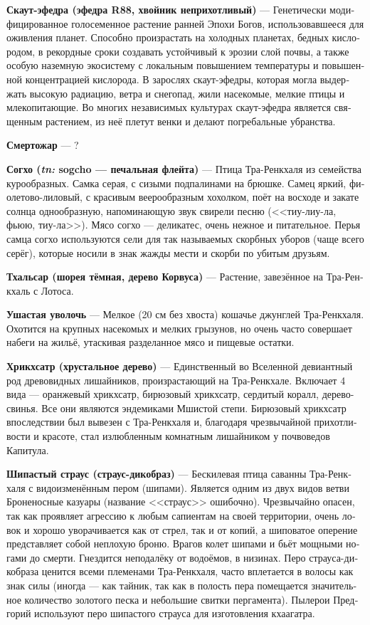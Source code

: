 \documentclass[a4paper,12pt,fleqn]{book}\usepackage{polyglossia}\setdefaultlanguage[babelshorthands=true]{russian}\setotherlanguage{english}\defaultfontfeatures{Ligatures=TeX,Mapping=tex-text}\usepackage{xcolor}\newcommand{\ml}[3]{#2}
\newcommand{\theterm}[3]{\textbf{\hypertarget{#1}{#2}} --- #3}
\newcommand{\theorigin}[3]{\textit{#1:} #2 --- #3}
\begin{document}
\theterm{scout-ephedra}
{Скаут-эфедра (эфедра R88, хвойник неприхотливый)}
{Генетически модифицированное голосеменное растение ранней Эпохи Богов, использовавшееся для оживления планет.
Способно произрастать на холодных планетах, бедных кислородом, в рекордные сроки создавать устойчивый к эрозии слой почвы, а также особую наземную экосистему с локальным повышением температуры и повышенной концентрацией кислорода.
В зарослях скаут-эфедры, которая могла выдержать высокую радиацию, ветра и снегопад, жили насекомые, мелкие птицы и млекопитающие.
Во многих независимых культурах скаут-эфедра является священным растением, из неё плетут венки и делают погребальные убранства.}

\theterm{deathly-heat}
{Смертожар}
{?}

\theterm{}
{Согхо (\theorigin{tn}{sogcho}{печальная флейта})}
{Птица Тра-Ренкхаля из семейства курообразных.
Самка серая, с сизыми подпалинами на брюшке.
Самец яркий, фиолетово-лиловый, с красивым веерообразным хохолком, поёт на восходе и закате солнца однообразную, напоминающую звук свирели песню (<<тиу-лиу-ла, фьюю, тиу-ла>>).
Мясо согхо --- деликатес, очень нежное и питательное.
Перья самца согхо используются сели для так называемых скорбных уборов (чаще всего серёг), которые носили в знак жажды мести и скорби по убитым друзьям.}

\theterm{tchal-sar}
{Тхальсар (шорея тёмная, дерево Корвуса)}
{Растение, завезённое на Тра-Ренкхаль с Лотоса.}

\theterm{large-eared-dragaway}
{Ушастая уволочь}
{Мелкое (20 см без хвоста) кошачье джунглей Тра-Ренкхаля.
Охотится на крупных насекомых и мелких грызунов, но очень часто совершает набеги на жильё, утаскивая разделанное мясо и пищевые остатки.}

\theterm{chrikchsatr}
{Хрикхсатр (хрустальное дерево)}
{Единственный во Вселенной девиантный род древовидных лишайников, произрастающий на Тра-Ренкхале.
Включает 4 вида --- оранжевый хрикхсатр, бирюзовый хрикхсатр, сердитый коралл, дерево-свинья.
Все они являются эндемиками Мшистой степи.
Бирюзовый хрикхсатр впоследствии был вывезен с Тра-Ренкхаля и, благодаря чрезвычайной прихотливости и красоте, стал излюбленным комнатным лишайником у почвоведов Капитула.}

\theterm{spiny-ostrich}
{Шипастый страус (страус-дикобраз)}
{Бескилевая птица саванны Тра-Ренкхаля с видоизменённым пером (шипами).
Является одним из двух видов ветви Броненосные казуары (название <<страус>> ошибочно).
Чрезвычайно опасен, так как проявляет агрессию к любым сапиентам на своей территории, очень ловок и хорошо уворачивается как от стрел, так и от копий, а шиповатое оперение представляет собой неплохую броню.
Врагов колет шипами и бьёт мощными ногами до смерти.
Гнездится неподалёку от водоёмов, в низинах.
Перо страуса-дикобраза ценится всеми племенами Тра-Ренкхаля, часто вплетается в волосы как знак силы (иногда --- как тайник, так как в полость пера помещается значительное количество золотого песка и небольшие свитки пергамента).
Пылерои Предгорий используют перо шипастого страуса для изготовления кхаагатра.}
\end{document}
